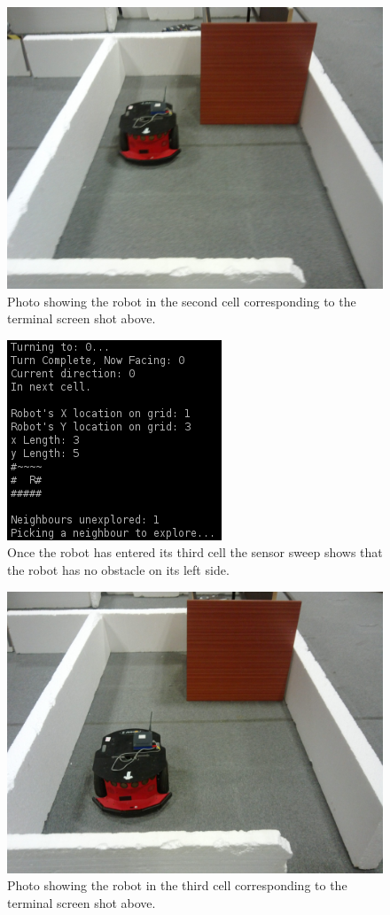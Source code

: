 \documentclass[a4paper,12pt]{article}
\begin{document}
\begin{figure}[H]
\includegraphics[scale=0.13]{RealS2.jpg}
\caption{Photo showing the robot in the second cell corresponding to the terminal screen shot above.}
\end{figure}

\begin{figure}[H]
\includegraphics[scale=1.0]{RealRunT3.png}
\caption{Once the robot has entered its third cell the sensor sweep shows that the robot has no obstacle on its left side.}
\end{figure}

\begin{figure}[H]
\includegraphics[scale=0.13]{RealS3.jpg}
\caption{Photo showing the robot in the third cell corresponding to the terminal screen shot above.}
\end{figure}
\end{document}
